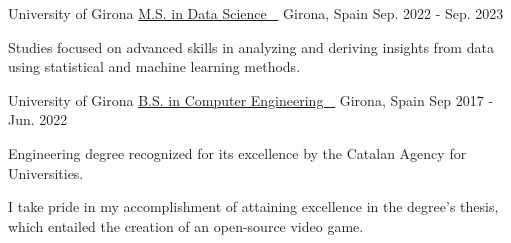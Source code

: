 

\begin{cventries}

  \cventry
    {University of Girona} %
    {\href{https://1drv.ms/b/s!AkpkVWgTjVvhg74dqDpDsNxsI39twQ?e=SC5mZC}{M.S. in Data Science \ {\scriptsize \faLink}}} %
    {Girona, Spain} %
    {Sep. 2022 - Sep. 2023} %
    {
      \begin{cvitems} %
      \item {
      Studies focused on advanced skills in analyzing and deriving insights from data using statistical and machine learning methods.
      }
      \end{cvitems}
    }

    \cventry
    {University of Girona} %
    {\href{https://1drv.ms/b/s!AkpkVWgTjVvhg74LnMHf7OWtWJlmrg?e=gcWA80}{B.S. in Computer Engineering \ {\scriptsize \faLink}}} %
    {Girona, Spain} %
    {Sep 2017 - Jun. 2022} %
    {
      \begin{cvitems} %
        \item {Engineering degree recognized for its excellence by the Catalan Agency for Universities.}
        \item {I take pride in my accomplishment of attaining excellence in the degree's thesis, which entailed the creation of an open-source video game.
}
      \end{cvitems}
    }

\end{cventries}
